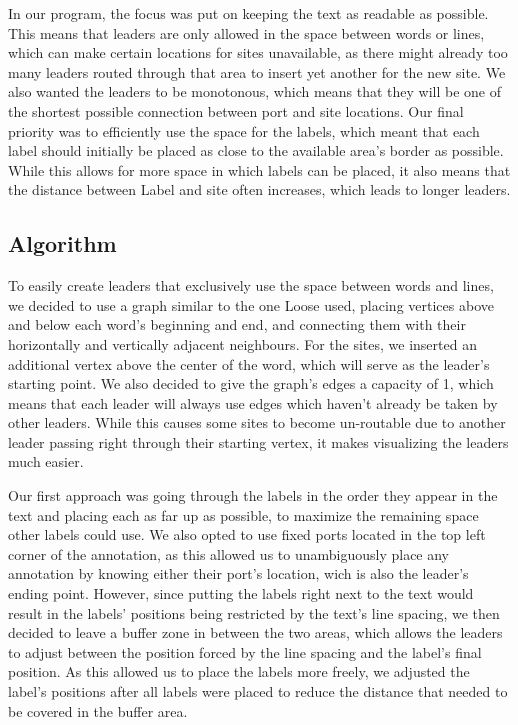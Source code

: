 \documentclass[11pt,a4paper]{article}
\begin{document}
In our program, the focus was put on keeping the text as readable as possible. This means that leaders are only allowed in the space between words or lines, which can make certain locations for sites unavailable, as there might already too many leaders routed through that area to insert yet another for the new site. 
We also wanted the leaders to be monotonous, which means that they will be one of the shortest possible connection between port and site locations.
Our final priority was to efficiently use the space for the labels, which meant that each label should initially be placed as close to the available area's border as possible.
While this allows for more space in which labels can be placed, it also means that the distance between Label and site often increases, which leads to longer leaders.%

\subsection{Algorithm}%
To easily create leaders that exclusively use the space between words and lines, we decided to use a graph similar to the one Loose \cite{Loose2015} used, placing vertices above and below each word's beginning and end, and connecting them with their horizontally and vertically adjacent neighbours.%
For the sites, we inserted an additional vertex above the center of the word, which will serve as the leader's starting point. We also decided to give the graph's edges a capacity of 1, which means that each leader will always use edges which haven't already be taken by other leaders. While this causes some sites to become un-routable due to another leader passing right through their starting vertex, it makes visualizing the leaders much easier.

Our first approach was going through the labels in the order they appear in the text and placing each as far up as possible, to maximize the remaining space other labels could use. We also opted to use fixed ports located in the top left corner of the annotation, as this allowed us to unambiguously place any annotation by knowing either their port's location, wich is also the leader's ending point.
However, since putting the labels right next to the text would result in the labels' positions being restricted by the text's line spacing, we then decided to leave a buffer zone in between the two areas, which allows the leaders to adjust between the position forced by the line spacing and the label's final position. As this allowed us to place the labels more freely, we adjusted the label's positions after all labels were placed to reduce the distance that needed to be covered in the buffer area.
\end{document}
